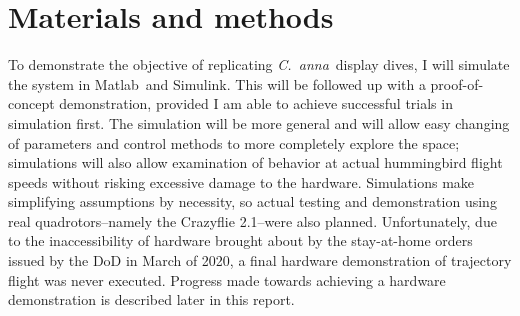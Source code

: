\documentclass[onecolumn,10pt]{IEEEtran}
\newcommand{\Canna}{\emph{C.~anna}}
\newcommand{\MATLAB}{Matlab}
\begin{document}
\section{Materials and methods}
To demonstrate the objective of replicating \Canna\ display dives,  I will simulate the system in \MATLAB\ and Simulink.  This will be followed up with a proof-of-concept demonstration, provided I am able to achieve successful trials in simulation first. The simulation will be more general and will allow easy changing of parameters and control methods to more completely explore the space; simulations will also allow examination of behavior at actual hummingbird flight speeds without risking excessive damage to the hardware. Simulations make simplifying assumptions by necessity, so actual testing and demonstration using real quadrotors--namely the Crazyflie 2.1--were also planned. Unfortunately, due to the inaccessibility of hardware brought about by the stay-at-home orders issued by the DoD in March of 2020, a final hardware demonstration of trajectory flight was never executed. Progress made towards achieving a hardware demonstration is described later in this report.  
\end{document}
